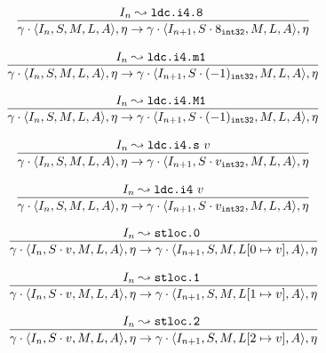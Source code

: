 \documentclass{article}
\numberwithin{equation}{section}
\newcommand{\mstate}[5] {
	\langle#1, #2, #3, #4, #5\rangle
}
\newcommand{\ipointsto}[3] {
	#1 \leadsto \texttt{#2} \text{ } #3
}
\newcommand{\sval}[2] {
	#1_\texttt{#2}
}
\newcommand{\setarrayitem}[3] {
	#1[#2 \mapsto #3]
}
\begin{document}
\begin{equation}
\label{eq:semantics_ldci48}
	\infer{
		\gamma \cdot \mstate{I_n}{S}{M}{L}{A}, \eta
			\rightarrow
		\gamma \cdot \mstate{I_{n+1}}{S \cdot \sval{8}{int32}}{M}{L}{A}, \eta
	}
	{\ipointsto{I_n}{ldc.i4.8}}
\end{equation}

\begin{equation}
\label{eq:semantics_ldci4m1}
	\infer{
		\gamma \cdot \mstate{I_n}{S}{M}{L}{A}, \eta
			\rightarrow
		\gamma \cdot \mstate{I_{n+1}}{S \cdot \sval{(-1)}{int32}}{M}{L}{A}, \eta
	}
	{\ipointsto{I_n}{ldc.i4.m1}}
\end{equation}

\begin{equation}
\label{eq:semantics_ldci4M1}
	\infer{
		\gamma \cdot \mstate{I_n}{S}{M}{L}{A}, \eta
			\rightarrow
		\gamma \cdot \mstate{I_{n+1}}{S \cdot \sval{(-1)}{int32}}{M}{L}{A}, \eta
	}
	{\ipointsto{I_n}{ldc.i4.M1}}
\end{equation}

\begin{equation}
\label{eq:semantics_ldci4s}
	\infer{
		\gamma \cdot \mstate{I_n}{S}{M}{L}{A}, \eta
			\rightarrow
		\gamma \cdot \mstate{I_{n+1}}{S \cdot \sval{v}{int32}}{M}{L}{A}, \eta
	}
	{\ipointsto{I_n}{ldc.i4.s}{v}}
\end{equation}

\begin{equation}
\label{eq:semantics_ldci4}
	\infer{
		\gamma \cdot \mstate{I_n}{S}{M}{L}{A}, \eta
			\rightarrow
		\gamma \cdot \mstate{I_{n+1}}{S \cdot \sval{v}{int32}}{M}{L}{A}, \eta
	}
	{\ipointsto{I_n}{ldc.i4}{v}}
\end{equation}

\begin{equation}
\label{eq:semantics_stloc0}
	\infer{
		\gamma \cdot \mstate{I_n}{S \cdot v}{M}{L}{A}, \eta
			\rightarrow
		\gamma \cdot \mstate{I_{n+1}}{S}{M}{\setarrayitem{L}{0}{v}}{A}, \eta
	}
	{\ipointsto{I_n}{stloc.0}}
\end{equation}

\begin{equation}
\label{eq:semantics_stloc1}
	\infer{
		\gamma \cdot \mstate{I_n}{S \cdot v}{M}{L}{A}, \eta
			\rightarrow
		\gamma \cdot \mstate{I_{n+1}}{S}{M}{\setarrayitem{L}{1}{v}}{A}, \eta
	}
	{\ipointsto{I_n}{stloc.1}}
\end{equation}

\begin{equation}
\label{eq:semantics_stloc2}
	\infer{
		\gamma \cdot \mstate{I_n}{S \cdot v}{M}{L}{A}, \eta
			\rightarrow
		\gamma \cdot \mstate{I_{n+1}}{S}{M}{\setarrayitem{L}{2}{v}}{A}, \eta
	}
	{\ipointsto{I_n}{stloc.2}}
\end{equation}
\end{document}
